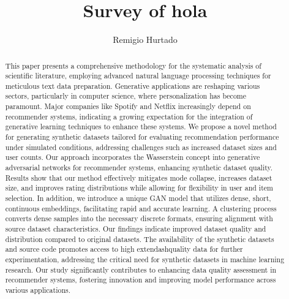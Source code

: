 \documentclass[runningheads]{llncs}
\begin{document}
%
\title{Survey of hola}
%
%
\author{Remigio Hurtado}
%
%
%
\maketitle    
%
\begin{abstract}
This paper presents a comprehensive methodology for the systematic analysis of scientific literature, employing advanced natural language processing techniques for meticulous text data preparation. Generative applications are reshaping various sectors, particularly in computer science, where personalization has become paramount. Major companies like Spotify and Netflix increasingly depend on recommender systems, indicating a growing expectation for the integration of generative learning techniques to enhance these systems. We propose a novel method for generating synthetic datasets tailored for evaluating recommendation performance under simulated conditions, addressing challenges such as increased dataset sizes and user counts. Our approach incorporates the Wasserstein concept into generative adversarial networks for recommender systems, enhancing synthetic dataset quality. Results show that our method effectively mitigates mode collapse, increases dataset size, and improves rating distributions while allowing for flexibility in user and item selection. In addition, we introduce a unique GAN model that utilizes dense, short, continuous embeddings, facilitating rapid and accurate learning. A clustering process converts dense samples into the necessary discrete formats, ensuring alignment with source dataset characteristics. Our findings indicate improved dataset quality and distribution compared to original datasets. The availability of the synthetic datasets and source code promotes access to high	extendash{}quality data for further experimentation, addressing the critical need for synthetic datasets in machine learning research. Our study significantly contributes to enhancing data quality assessment in recommender systems, fostering innovation and improving model performance across various applications.
\end{abstract}
\end{document}
